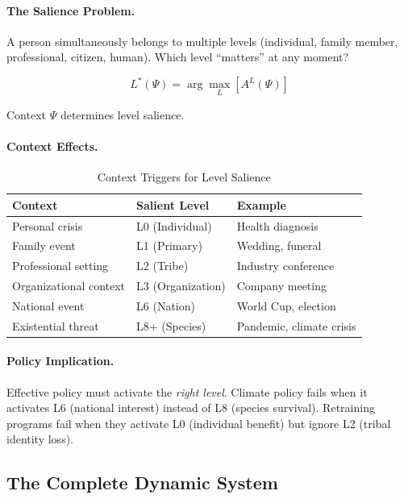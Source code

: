 \paragraph{The Salience Problem.}
A person simultaneously belongs to multiple levels (individual, family member, 
professional, citizen, human). Which level ``matters'' at any moment?

\begin{equation}
L^*(\Psi) = \arg\max_L \left[ A^L(\Psi) \right]
\end{equation}

Context $\Psi$ determines level salience.

\paragraph{Context Effects.}
\begin{table}[htbp]
\centering
\caption{Context Triggers for Level Salience}
\label{tab:gtwh-salience}
\renewcommand{\arraystretch}{1.3}
\begin{tabular}{@{}lll@{}}
\toprule
\textbf{Context} & \textbf{Salient Level} & \textbf{Example} \\
\midrule
Personal crisis & L0 (Individual) & Health diagnosis \\
Family event & L1 (Primary) & Wedding, funeral \\
Professional setting & L2 (Tribe) & Industry conference \\
Organizational context & L3 (Organization) & Company meeting \\
National event & L6 (Nation) & World Cup, election \\
Existential threat & L8+ (Species) & Pandemic, climate crisis \\
\bottomrule
\end{tabular}
\end{table}

\paragraph{Policy Implication.}
Effective policy must activate the \textit{right level}. Climate policy 
fails when it activates L6 (national interest) instead of L8 (species survival). 
Retraining programs fail when they activate L0 (individual benefit) but 
ignore L2 (tribal identity loss).

\subsection{The Complete Dynamic System}

